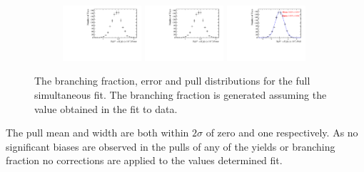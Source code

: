 \begin{figure}[!h]
   \centering
   \begin{subfigure}[t]{1.0\textwidth}
      \includegraphics[width=0.32\textwidth]{figs/B2DsPhi/Plots_DsKK_Error_Branching_fraction.pdf}
      \includegraphics[width=0.32\textwidth]{figs/B2DsPhi/Plots_DsKK_Error_Branching_fraction.pdf}
      \includegraphics[width=0.32\textwidth]{figs/B2DsPhi/Plots_DsKK_Pull_Branching_fraction.pdf}
   \end{subfigure}
   \caption{The branching fraction, error and pull distributions for the full simultaneous fit. The branching fraction is generated assuming the value obtained in the fit to data.}
   \label{fig:B2DsPhi_Pulls_signal}
\end{figure}
The pull mean and width are both within $2\sigma$ of zero and one respectively. 
As no significant biases are observed in the pulls of any of the yields or branching fraction no corrections are applied to the values determined fit.